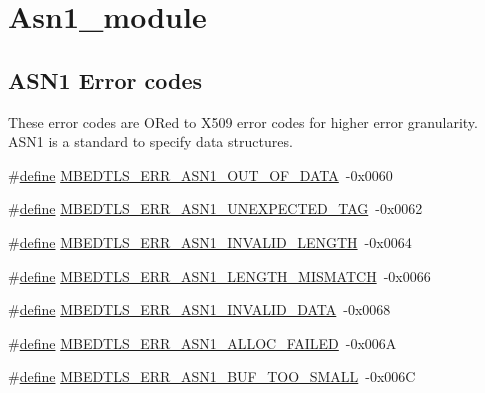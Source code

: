 \hypertarget{group__asn1__module}{}\section{Asn1\+\_\+module}
\label{group__asn1__module}
\subsection*{A\+S\+N1 Error codes}
\label{_amgrp91652e79e1691c582917ccf754f9d814}%
These error codes are OR\textquotesingle{}ed to X509 error codes for higher error granularity. A\+S\+N1 is a standard to specify data structures. \begin{DoxyCompactItemize}
\item 
\#\hyperlink{structdefine}{define} \hyperlink{group__asn1__module_ga284c12cf03a4ffeee89a63750f00dfdd}{M\+B\+E\+D\+T\+L\+S\+\_\+\+E\+R\+R\+\_\+\+A\+S\+N1\+\_\+\+O\+U\+T\+\_\+\+O\+F\+\_\+\+D\+A\+TA}~-\/0x0060
\item 
\#\hyperlink{structdefine}{define} \hyperlink{group__asn1__module_gab055945fda47ad0e16dc59f8c5ecb86e}{M\+B\+E\+D\+T\+L\+S\+\_\+\+E\+R\+R\+\_\+\+A\+S\+N1\+\_\+\+U\+N\+E\+X\+P\+E\+C\+T\+E\+D\+\_\+\+T\+AG}~-\/0x0062
\item 
\#\hyperlink{structdefine}{define} \hyperlink{group__asn1__module_ga0ebe8e0a4894533db505303504eea59b}{M\+B\+E\+D\+T\+L\+S\+\_\+\+E\+R\+R\+\_\+\+A\+S\+N1\+\_\+\+I\+N\+V\+A\+L\+I\+D\+\_\+\+L\+E\+N\+G\+TH}~-\/0x0064
\item 
\#\hyperlink{structdefine}{define} \hyperlink{group__asn1__module_gacf6fad8d80fa050c3463539412674a20}{M\+B\+E\+D\+T\+L\+S\+\_\+\+E\+R\+R\+\_\+\+A\+S\+N1\+\_\+\+L\+E\+N\+G\+T\+H\+\_\+\+M\+I\+S\+M\+A\+T\+CH}~-\/0x0066
\item 
\#\hyperlink{structdefine}{define} \hyperlink{group__asn1__module_ga9ac36bf8c63a9968afe1d35d0569e4d8}{M\+B\+E\+D\+T\+L\+S\+\_\+\+E\+R\+R\+\_\+\+A\+S\+N1\+\_\+\+I\+N\+V\+A\+L\+I\+D\+\_\+\+D\+A\+TA}~-\/0x0068
\item 
\#\hyperlink{structdefine}{define} \hyperlink{group__asn1__module_gab7d40360e48e414ffa1a4df1961723d2}{M\+B\+E\+D\+T\+L\+S\+\_\+\+E\+R\+R\+\_\+\+A\+S\+N1\+\_\+\+A\+L\+L\+O\+C\+\_\+\+F\+A\+I\+L\+ED}~-\/0x006A
\item 
\#\hyperlink{structdefine}{define} \hyperlink{group__asn1__module_gaf9bf64017ed866c846b506e80dc15e94}{M\+B\+E\+D\+T\+L\+S\+\_\+\+E\+R\+R\+\_\+\+A\+S\+N1\+\_\+\+B\+U\+F\+\_\+\+T\+O\+O\+\_\+\+S\+M\+A\+LL}~-\/0x006C
\end{DoxyCompactItemize}

